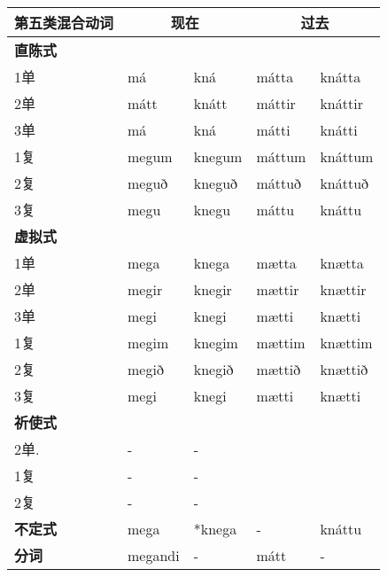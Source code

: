 \begin{longtable}{lllll}
    \toprule
    第五类混合动词      & \multicolumn{2}{c}{现在} & \multicolumn{2}{c}{过去}                    \\
    \midrule
    \endhead
    \bottomrule
    \endfoot
    \textbf{直陈式} & ~                      & ~                      & ~      & ~       \\
    1单           & má                     & kná                    & mátta  & knátta  \\
    2单           & mátt                   & knátt                  & máttir & knáttir \\
    3单           & má                     & kná                    & mátti  & knátti  \\
    1复           & megum                  & knegum                 & máttum & knáttum \\
    2复           & meguð                  & kneguð                 & máttuð & knáttuð \\
    3复           & megu                   & knegu                  & máttu  & knáttu  \\
    \textbf{虚拟式} & ~                      & ~                      & ~      & ~       \\
    1单           & mega                   & knega                  & mætta  & knætta  \\
    2单           & megir                  & knegir                 & mættir & knættir \\
    3单           & megi                   & knegi                  & mætti  & knætti  \\
    1复           & megim                  & knegim                 & mættim & knættim \\
    2复           & megið                  & knegið                 & mættið & knættið \\
    3复           & megi                   & knegi                  & mætti  & knætti  \\
    \textbf{祈使式} & ~                      & ~                      & ~      & ~       \\
    2单.          & -                      & -                      & ~      & ~       \\
    1复           & -                      & -                      & ~      & ~       \\
    2复           & -                      & -                      & ~      & ~       \\
    \textbf{不定式} & mega                   & *knega                 & -      & knáttu  \\
    \textbf{分词}  & megandi                & -                      & mátt   & -       \\
\end{longtable}

